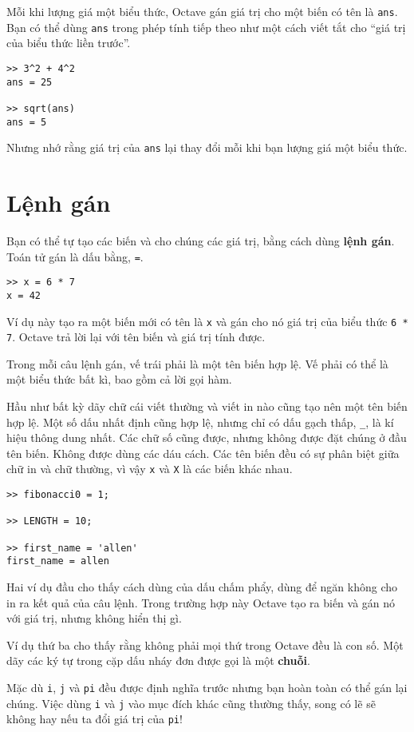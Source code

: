 \documentclass[12pt]{book}
\begin{document}
Mỗi khi lượng giá một biểu thức, Octave gán giá trị cho một biến
có tên là {\tt ans}.  Bạn có thể dùng {\tt ans} trong phép tính tiếp
theo như một cách viết tắt cho ``giá trị của biểu thức liền trước''.

\begin{verbatim}
>> 3^2 + 4^2
ans = 25

>> sqrt(ans)
ans = 5
\end{verbatim}
%
Nhưng nhớ rằng giá trị của {\tt ans} lại thay đổi mỗi khi bạn lượng
giá một biểu thức.


\section{Lệnh gán}

Bạn có thể tự tạo các biến và cho chúng các giá trị, bằng cách dùng
{\bf lệnh gán}. Toán tử gán là dấu bằng, {\tt =}.

\begin{verbatim}
>> x = 6 * 7
x = 42
\end{verbatim}
%
Ví dụ này tạo ra một biến mới có tên là {\tt x} và gán cho nó giá trị
của biểu thức {\tt 6 * 7}.  Octave trả lời lại với tên biến và
giá trị tính được.

Trong mỗi câu lệnh gán, vế trái phải là một tên biến hợp lệ. Vế phải
có thể là một biểu thức bất kì, bao gồm cả lời gọi hàm.

Hầu như bất kỳ dãy chữ cái viết thường và viết in nào cũng tạo nên
một tên biến hợp lệ. Một số dấu nhất định cũng hợp lệ, nhưng chỉ có
dấu gạch thấp, {\tt \_}, là kí hiệu thông dung nhất. Các chữ số cũng
được, nhưng không được đặt chúng ở đầu tên biến. Không được dùng
các dáu cách. Các tên biến đều có sự phân biệt giữa chữ in và chữ
thường, vì vậy {\tt x} và {\tt X} là các biến khác nhau.

\begin{verbatim}
>> fibonacci0 = 1;

>> LENGTH = 10;

>> first_name = 'allen'
first_name = allen
\end{verbatim}
%
Hai ví dụ đầu cho thấy cách dùng của dấu chấm phẩy, dùng để ngăn
không cho in ra kết quả của câu lệnh. Trong trường hợp này Octave
tạo ra biến và gán nó với giá trị, nhưng không hiển thị gì.

Ví dụ thứ ba cho thấy rằng không phải mọi thứ trong Octave đều
là con số. Một dãy các ký tự trong cặp dấu nháy đơn được gọi là
một {\bf chuỗi}.

Mặc dù {\tt i}, {\tt j} và {\tt pi} đều được định nghĩa trước nhưng
bạn hoàn toàn có thể gán lại chúng. Việc dùng {\tt i} và {\tt j} vào
mục đích khác cũng thường thấy, song có lẽ sẽ không hay nếu ta
đổi giá trị của {\tt pi}!
\end{document}
